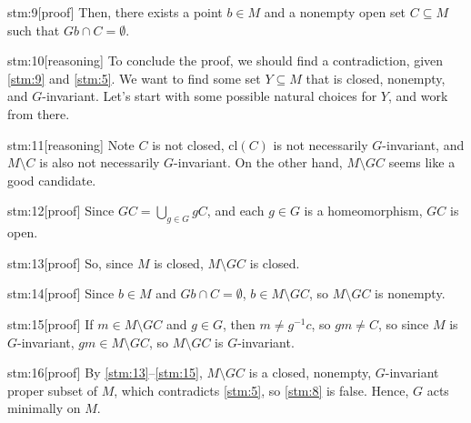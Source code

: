 \begin{stm}{stm:9}[proof]
Then, there exists a point $b \in M$ and a nonempty open set $C \subseteq M$ such that $Gb \cap C = \emptyset$.
\end{stm}

\begin{stm}{stm:10}[reasoning]
To conclude the proof, we should find a contradiction, given \ref{stm:9} and \ref{stm:5}. We want to find some set $Y \subseteq M$ that is closed, nonempty, and $G$-invariant. Let's start with some possible natural choices for $Y$, and work from there.
\end{stm}

\begin{stm}{stm:11}[reasoning]
Note $C$ is not closed, $\text{cl}(C)$ is not necessarily $G$-invariant, and $M \setminus C$ is also not necessarily $G$-invariant. On the other hand, $M \setminus GC$ seems like a good candidate.
\end{stm}

\begin{stm}{stm:12}[proof]
Since $GC = \bigcup_{g \in G} gC$, and each $g \in G$ is a homeomorphism, $GC$ is open.
\end{stm}

\begin{stm}{stm:13}[proof]
So, since $M$ is closed, $M \setminus GC$ is closed.
\end{stm}

\begin{stm}{stm:14}[proof]
Since $b \in M$ and $Gb \cap C = \emptyset$, $b \in M \setminus GC$, so $M \setminus GC$ is nonempty.
\end{stm}

\begin{stm}{stm:15}[proof]
If $m \in M \setminus GC$ and $g \in G$, then $m \ne g^{-1}c$, so $gm \ne C$, so since $M$ is $G$-invariant, $gm \in M \setminus GC$, so $M \setminus GC$ is $G$-invariant.
\end{stm}

\begin{stm}{stm:16}[proof]
By \ref{stm:13}–\ref{stm:15}, $M \setminus GC$ is a closed, nonempty, $G$-invariant proper subset of $M$, which contradicts \ref{stm:5}, so \ref{stm:8} is false. Hence, $G$ acts minimally on $M$.
\end{stm}